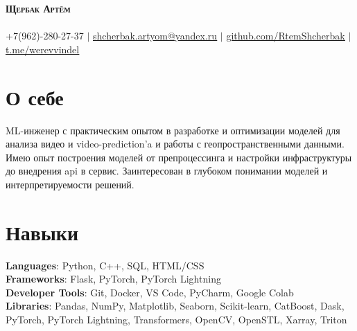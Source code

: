 \documentclass[letterpaper,11pt]{article}
\newcommand{\resumeSubHeadingListStart}{\begin{itemize}[leftmargin=0.15in, label={}]}
\newcommand{\resumeSubHeadingListEnd}{\end{itemize}}
\begin{document}

\begin{center}
    \textbf{\Huge \scshape Щербак Артём} \\ \vspace{10pt}
     \\ \vspace{10pt}
    \small +7(962)-280-27-37 $|$ 
    \href{mailto:shcherbak.artyom@yandex.ru}{\underline{shcherbak.artyom@yandex.ru}} $|$ 
    \href{https://github.com/RtemShcherbak}{\underline{github.com/RtemShcherbak}} $|$
    \href{https://t.me/werevvindel}{\underline{t.me/werevvindel}}
\end{center}

\section{О себе}
  \resumeSubHeadingListStart
  {ML-инженер с практическим опытом в разработке и оптимизации моделей для анализа видео и video-prediction'a и работы с геопространственными данными. Имею опыт построения моделей от препроцессинга и настройки инфраструктуры до внедрения api в сервис. Заинтересован в глубоком понимании моделей и интерпретируемости решений.}
  \resumeSubHeadingListEnd

\section{Навыки}
 \begin{itemize}[leftmargin=0.15in, label={}]
    \small{\item{
     \textbf{Languages}{: Python, C++, SQL, HTML/CSS} \\
     \textbf{Frameworks}{: Flask, PyTorch, PyTorch Lightning} \\
     \textbf{Developer Tools}{: Git, Docker, VS Code, PyCharm, Google Colab} \\
     \textbf{Libraries}{: Pandas, NumPy, Matplotlib, Seaborn, Scikit-learn, CatBoost, Dask, PyTorch, PyTorch Lightning, Transformers, OpenCV, OpenSTL, Xarray, Triton}
    }}
 \end{itemize}
\end{document}
